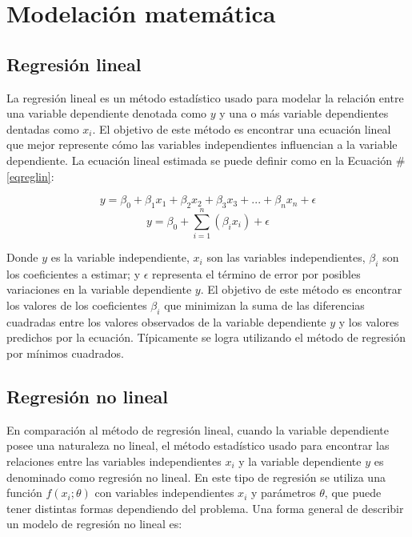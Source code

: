 \section{Modelación matemática} \label{modmatsec}
\subsection{Regresión lineal}
La regresión lineal es un método estadístico usado para modelar la relación entre una variable dependiente denotada como $y$ y una o más variable dependientes dentadas como $x_{i}$. El objetivo de este método es encontrar una ecuación lineal que mejor represente cómo las variables independientes influencian a la variable dependiente. La ecuación lineal estimada se puede definir como en la Ecuación \#\ref{eqreglin}:

\begin{equation*}
    y = \beta_{0} + \beta_{1}x_{1} + \beta_{2}x_{2} + \beta_{3}x_{3} + ... + \beta_{n}x_{n} + \epsilon
\end{equation*}
\begin{equation}
    y = \beta_{0} + \sum_{i=1}^{n}(\beta_{i}x_{i}) + \epsilon \label{eqreglin}
\end{equation}

Donde $y$ es la variable independiente, $x_{i}$ son las variables independientes, $\beta_{i}$ son los coeficientes a estimar; y $\epsilon$ representa el término de error por posibles variaciones en la variable dependiente $y$. El objetivo de este método es encontrar los valores de los coeficientes $\beta_{i}$ que minimizan la suma de las diferencias cuadradas entre los valores observados de la variable dependiente $y$ y los valores predichos por la ecuación. Típicamente se logra utilizando el método de regresión por mínimos cuadrados.

\subsection{Regresión no lineal}

En comparación al método de regresión lineal, cuando la variable dependiente posee una naturaleza no lineal, el método estadístico usado para encontrar las relaciones entre las variables independientes $x_{i}$ y la variable dependiente $y$ es denominado como regresión no lineal. En este tipo de regresión se utiliza una función $f(x_{i};\theta)$ con variables independientes $x_{i}$ y parámetros $\theta$, que puede tener distintas formas dependiendo del problema. Una forma general de describir un modelo de regresión no lineal es:

